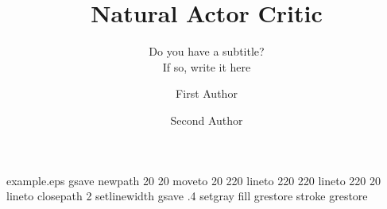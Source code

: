 %
%
%
%
%
\begin{filecontents*}{example.eps}
gsave
newpath
  20 20 moveto
  20 220 lineto
  220 220 lineto
  220 20 lineto
closepath
2 setlinewidth
gsave
  .4 setgray fill
grestore
stroke
grestore
\end{filecontents*}
%
\RequirePackage{fix-cm}
%
\documentclass[smallextended]{svjour3}       %
%
\smartqed  %
%
\usepackage{graphicx}
%
%

\usepackage{natbib} %



%
%

\title{Natural Actor Critic
}
\subtitle{Do you have a subtitle?\\ If so, write it here}


\author{First Author         \and
        Second Author %
}

